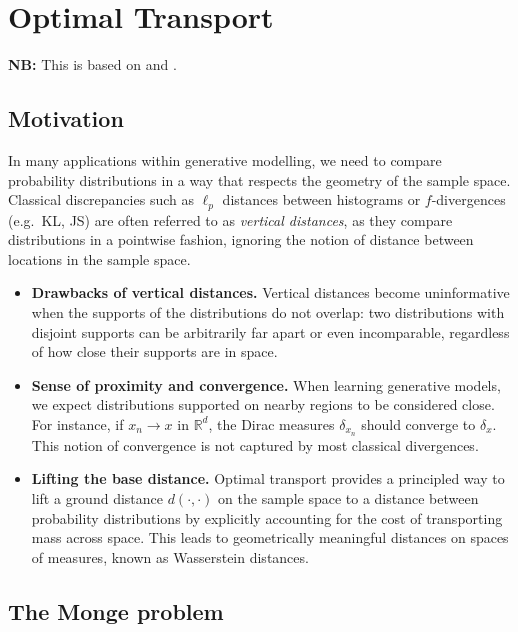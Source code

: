 \chapter{Optimal Transport}

\textbf{NB:} This is based on \cite[Ch.~1-2]{peyre_cuturi_2019} and \cite{kingma2013auto}.

\section{Motivation}

In many applications within generative modelling, we need to compare probability distributions in a way that respects the geometry of the sample space. Classical discrepancies such as $\ell_p$ distances between histograms or $f$-divergences (e.g.\ KL, JS) are often
referred to as \emph{vertical distances}, as they compare distributions in a pointwise fashion, ignoring the notion of distance between locations in the sample space.

\begin{itemize}
    \item \textbf{Drawbacks of vertical distances.}
    Vertical distances become uninformative when the supports of the distributions do not overlap: two distributions with disjoint supports can be arbitrarily far apart or even incomparable, regardless of how close their supports are in space.

    \item \textbf{Sense of proximity and convergence.}
    When learning generative models, we expect distributions supported on nearby regions to be considered close. For instance, if $x_n \to x$ in $\mathbb{R}^d$, the Dirac measures $\delta_{x_n}$ should converge to $\delta_x$. This notion of convergence is not captured by most classical divergences.

    \item \textbf{Lifting the base distance.}
    Optimal transport provides a principled way to lift a ground distance
    $d(\cdot,\cdot)$ on the sample space to a distance between probability
    distributions by explicitly accounting for the cost of transporting mass across space. This leads to geometrically meaningful distances on spaces of measures, known as Wasserstein distances.
\end{itemize}

\section{The Monge problem}

